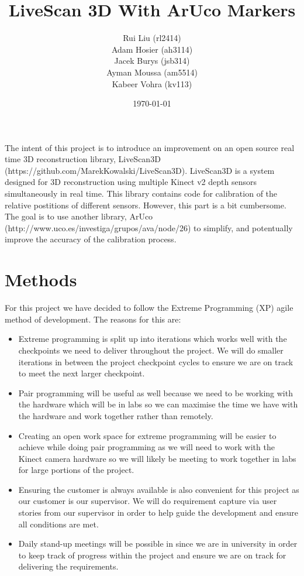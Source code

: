 \documentclass[a4paper,12pt]{article}
\title{LiveScan 3D With ArUco Markers}
\author{Rui Liu (rl2414)\\Adam Hosier (ah3114)\\Jacek Burys (jsb314)\\Ayman Moussa (am5514)\\Kabeer Vohra (kv113)}
\date{\today}
\begin{document}
\maketitle

The intent of this project is to introduce an improvement on an open source real time 3D reconstruction library, LiveScan3D (https://github.com/MarekKowalski/LiveScan3D).
LiveScan3D is a system designed for 3D reconstruction using multiple Kinect v2 depth sensors simultaneously in real time.
This library contains code for calibration of the relative postitions of different sensors. However, this part is a bit cumbersome.
The goal is to use another library, ArUco (http://www.uco.es/investiga/grupos/ava/node/26) to simplify, and potentually improve the accuracy of the calibration process. 

\section*{Methods}
For this project we have decided to follow the Extreme Programming (XP) agile method of development. The reasons for this are:

\begin{itemize}
\item Extreme programming is split up into iterations which works well with the checkpoints we need to deliver throughout the project. We will do smaller iterations in between the project checkpoint cycles to ensure we are on track to meet the next larger checkpoint.
\item Pair programming will be useful as well because we need to be working with the hardware which will be in labs so we can maximise the time we have with the hardware and work together rather than remotely.
\item Creating an open work space for extreme programming will be easier to achieve while doing pair programming as we will need to work with the Kinect camera hardware so we will likely be meeting to work together in labs for large portions of the project.
\item Ensuring the customer is always available is also convenient for this project as our customer is our supervisor. We will do requirement capture via user stories from our supervisor in order to help guide the development and ensure all conditions are met.
\item Daily stand-up meetings will be possible in since we are in university in order to keep track of progress within the project and ensure we are on track for delivering the requirements.
\end{itemize}
\end{document}
